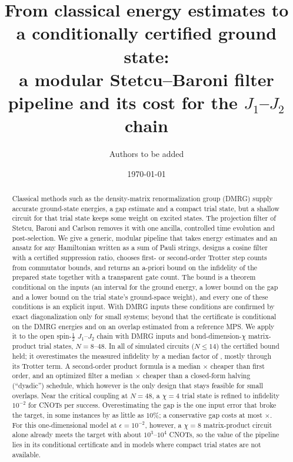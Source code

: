 \documentclass[aps,pra,twocolumn,superscriptaddress,nofootinbib]{revtex4-2}
\begin{document}
\title{From classical energy estimates to a conditionally certified ground state:\\
a modular Stetcu--Baroni filter pipeline and its cost for the $J_1$--$J_2$ chain}

\author{Authors to be added}
\date{\today}

\begin{abstract}
Classical methods such as the density-matrix renormalization group (DMRG) supply accurate
ground-state energies, a gap estimate and a compact trial state, but a shallow circuit for that trial
state keeps some weight on excited states. The projection filter of Stetcu, Baroni and Carlson removes
it with one ancilla, controlled time evolution and post-selection. We give a generic, modular pipeline
that takes energy estimates and an ansatz for any Hamiltonian written as a sum of Pauli strings, designs
a cosine filter with a certified suppression ratio, chooses first- or second-order Trotter step counts
from commutator bounds, and returns an a-priori bound on the infidelity of the prepared state together
with a transparent gate count. The bound is a theorem conditional on the inputs (an interval for the
ground energy, a lower bound on the gap and a lower bound on the trial state's ground-space weight), and
every one of these conditions is an explicit input. With DMRG inputs these conditions are confirmed by
exact diagonalization only for small systems; beyond that the certificate is conditional on the DMRG
energies and on an overlap estimated from a reference MPS. We apply it to the open spin-$\tfrac12$ $J_1$--$J_2$ chain with DMRG inputs and
bond-dimension-$\chi$ matrix-product trial states, $N=8$--$48$. In all \nSimOK{} of \nSim{} simulated
circuits ($N\le14$) the certified bound held; it overestimates the measured infidelity by a median
factor of \boundRatioMed, mostly through its Trotter term. A second-order product formula is a median
\gainOrderMed$\times$ cheaper than first order, and an optimized filter a median \gainOptMed$\times$
cheaper than a closed-form halving (``dyadic'') schedule, which however is the only design that stays
feasible for small overlaps. Near the critical coupling at $N=48$, a $\chi=4$ trial state is refined to
infidelity $10^{-2}$ for \cnotFortyEightChiFour{} CNOTs per success. Overestimating the gap is the one input error
that broke the target, in some instances by as little as $10\%$; a conservative gap costs at most
\gapMarginCost$\times$. For this one-dimensional model at $\epsilon=10^{-2}$, however, a $\chi=8$
matrix-product circuit alone already meets the target with about $10^{3}$--$10^{4}$ CNOTs, so the value of
the pipeline lies in its conditional certificate and in models where compact trial states are not available.
\end{abstract}
\end{document}
